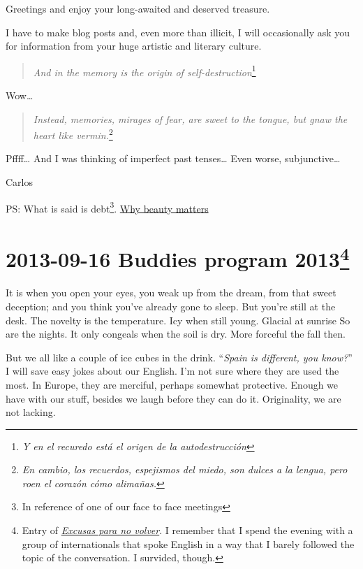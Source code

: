 \documentclass[]{book}
\let\rmarkdownfootnote\footnote%
\def\footnote{\protect\rmarkdownfootnote}
\begin{document}
Greetings and enjoy your long-awaited and deserved treasure.

I have to make blog posts and, even more than illicit, I will occasionally ask you for information from your huge artistic and literary culture.

\begin{quote}
\emph{And in the memory is the origin of self-destruction}\footnote{\emph{Y en el recuredo está el origen de la autodestrucción}}
\end{quote}

Wow\ldots{}

\begin{quote}
\emph{Instead, memories, mirages of fear, are sweet to the tongue, but gnaw the heart like vermin.}\footnote{\emph{En cambio, los recuerdos, espejismos del miedo, son dulces a la lengua, pero roen el corazón cómo alimañas.}}

\citet{llamazares1985lentitud}
\end{quote}

Pffff\ldots{} And I was thinking of imperfect past tenses\ldots{} Even worse, subjunctive\ldots{}

Carlos

PS: What is said is debt\footnote{In reference of one of our face to face meetings}. \href{https://en.wikipedia.org/wiki/Why_Beauty_Matters}{Why beauty matters}

\hypertarget{Excusas20130916}{%
\section*{\texorpdfstring{2013-09-16 Buddies program 2013\footnote{Entry of \href{https://excusasparanovolver.blogspot.com/2013/09/buddies-program-2013.html}{\emph{Excusas para no volver}}. I remember that I spend the evening with a group of internationals that spoke English in a way that I barely followed the topic of the conversation. I survided, though.}}{2013-09-16 Buddies program 2013}}\label{Excusas20130916}}

It is when you open your eyes, you weak up from the dream, from that sweet deception; and you think you've already gone to sleep. But you're still at the desk. The novelty is the temperature. Icy when still young. Glacial at sunrise So are the nights. It only congeals when the soil is dry. More forceful the fall then.

But we all like a couple of ice cubes in the drink. ``\emph{Spain is different, you know?}'' I will save easy jokes about our English. I'm not sure where they are used the most. In Europe, they are merciful, perhaps somewhat protective. Enough we have with our stuff, besides we laugh before they can do it. Originality, we are not lacking.
\end{document}
